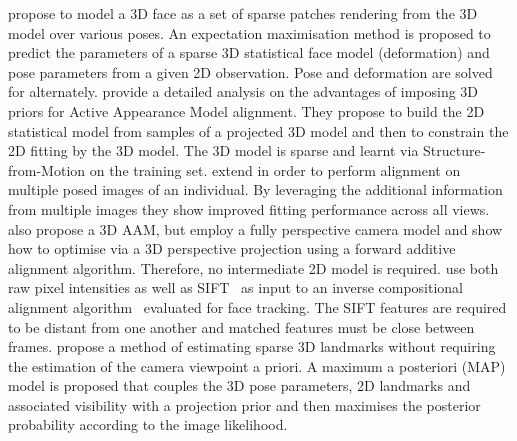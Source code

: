 \citet{lie2006alignment} propose to model a 3D face as a set of sparse patches
rendering from the 3D model over various poses. An expectation maximisation
method is proposed to predict the parameters of a sparse 3D statistical face
model (deformation) and pose parameters from a given 2D observation. Pose
and deformation are solved for alternately.
\cite{Matthews:2007gb} provide a detailed analysis on the advantages
of imposing 3D priors for Active Appearance Model alignment. They propose to
build the 2D statistical model from samples of a projected 3D model and then
to constrain the 2D fitting by the 3D model. The 3D model is sparse and learnt
via Structure-from-Motion on the training set. \citet{Ramnath:2008jp} extend
\cite{Matthews:2007gb} in order to perform alignment on multiple posed
images of an individual. By leveraging the additional information from
multiple images they show improved fitting performance across all views.
\cite{Martins:2013hp} also propose a 3D AAM, but employ a fully perspective
camera model and show how to optimise via a 3D perspective projection
using a forward additive alignment algorithm. Therefore, no intermediate
2D model is required.
\cite{Liao:2010fy} use both raw pixel intensities as well as 
SIFT~\cite{lowe2004distinctive} as input to an inverse compositional alignment
algorithm~\cite{baker2004lucas} evaluated for face tracking. The SIFT features 
are required to be distant from one another and matched features must be close 
between frames. 
\citet{Wang:2011kr} propose a method of estimating sparse 3D landmarks without 
requiring the estimation of the camera viewpoint a priori. A maximum a
posteriori (MAP) model is proposed that couples the 3D pose parameters, 2D
landmarks and associated visibility with a projection prior and then maximises
the posterior probability according to the image likelihood.

